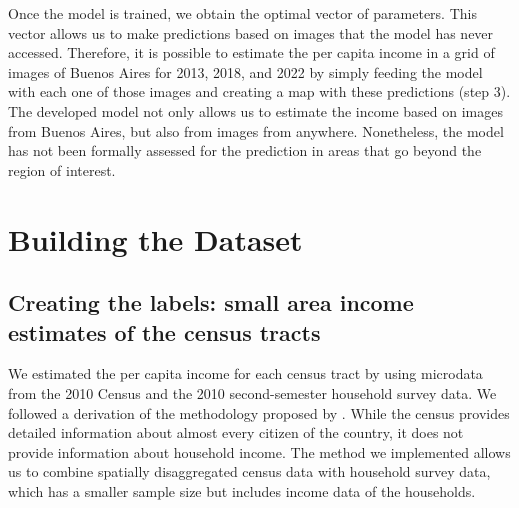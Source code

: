\documentclass[conference]{IEEEtran}
\begin{document}
Once the model is trained, we obtain the optimal vector of parameters. This vector allows us to make predictions based on images that the model has never accessed. Therefore, it is possible to estimate the per capita income in a grid of images of Buenos Aires for 2013, 2018, and 2022 by simply feeding the model with each one of those images and creating a map with these predictions (step 3). The developed model not only allows us to estimate the income based on images from Buenos Aires, but also from images from anywhere. Nonetheless, the model has not been formally assessed for the prediction in areas that go beyond the region of interest.

\section{Building the Dataset}\label{sec:datos}

\subsection{Creating the labels: small area income estimates of the census tracts}
\label{metodosae}




We estimated the per capita income for each census tract by using microdata from the 2010 Census and the 2010 second-semester household survey data. We followed a derivation of the methodology proposed by \citet{Elbers2003}. While the census provides detailed information about almost every citizen of the country, it does not provide information about household income. The method we implemented allows us to combine spatially disaggregated census data with household survey data, which has a smaller sample size but includes income data of the households.
\end{document}
